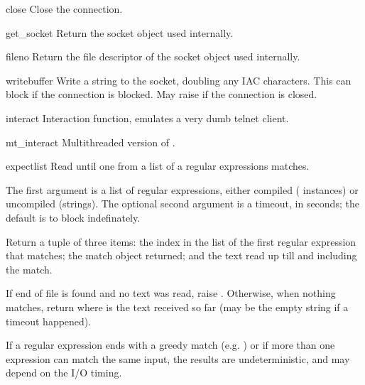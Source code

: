 \begin{methoddesc}{close}{}
Close the connection.
\end{methoddesc}

\begin{methoddesc}{get_socket}{}
Return the socket object used internally.
\end{methoddesc}

\begin{methoddesc}{fileno}{}
Return the file descriptor of the socket object used internally.
\end{methoddesc}

\begin{methoddesc}{write}{buffer}
Write a string to the socket, doubling any IAC characters.
This can block if the connection is blocked.  May raise
 if the connection is closed.
\end{methoddesc}

\begin{methoddesc}{interact}{}
Interaction function, emulates a very dumb telnet client.
\end{methoddesc}

\begin{methoddesc}{mt_interact}{}
Multithreaded version of .
\end{methoddesc}

\begin{methoddesc}{expect}{list}
Read until one from a list of a regular expressions matches.

The first argument is a list of regular expressions, either
compiled ( instances) or uncompiled (strings).
The optional second argument is a timeout, in seconds; the default
is to block indefinately.

Return a tuple of three items: the index in the list of the
first regular expression that matches; the match object
returned; and the text read up till and including the match.

If end of file is found and no text was read, raise
.  Otherwise, when nothing matches, return
 where  is the text received so
far (may be the empty string if a timeout happened).

If a regular expression ends with a greedy match (e.g. )
or if more than one expression can match the same input, the
results are undeterministic, and may depend on the I/O timing.
\end{methoddesc}
